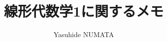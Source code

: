 \documentclass[tombow,dvipdfmx]{jsbook}
\theoremstyle{plain}
\theoremstyle{japanese}
\theoremstyle{remark}
\theoremstyle{japanese}
\theoremstyle{definition}
\theoremstyle{japanese}
\theoremstyle{definition}
\theoremstyle{numberedproof}
\theoremstyle{japanesenumberedproof}
\begin{document}
\title{線形代数学1に関するメモ}

\author{Yasuhide NUMATA}

\maketitle




%

%


\appendix



{\printindex}
\end{document}
